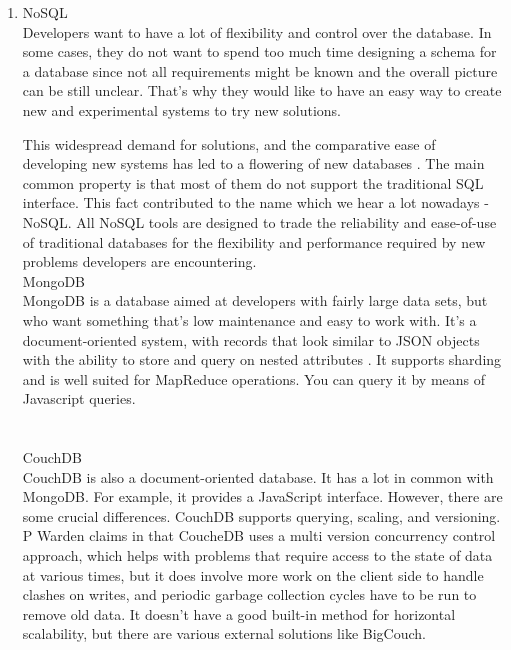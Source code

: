 \documentclass[runningheads]{llncs}
\begin{document}
\begin{enumerate}
\item NoSQL\\

Developers want to have a lot of flexibility and control over the database. In some cases, they do not want to spend too much time designing a schema for a database since not all requirements might be known and the overall picture can be still unclear. That's why they would like to have an easy way to create new and experimental systems to try new solutions.

This widespread demand for solutions, and the comparative ease of developing new systems has led to a flowering of new databases \cite{GLOSSARY}. The main common property is that most of them do not support the traditional SQL interface. This fact contributed to the name which we hear a lot nowadays - NoSQL. All NoSQL tools are designed to trade the reliability and ease-of-use of traditional databases for the flexibility and performance required by new problems developers are encountering.\\

MongoDB\\

MongoDB is a database aimed at developers with fairly large data sets, but who want something that's low maintenance and easy to work with. It's a document-oriented system, with records that look similar to JSON objects with the ability to store and query on nested attributes \cite{GLOSSARY}. It supports sharding and is well suited for MapReduce operations. You can query it by means of Javascript queries.\\
\\
\\
CouchDB\\

CouchDB is also a document-oriented database. It has a lot in common with MongoDB. For example, it provides
a JavaScript interface. However, there are some crucial differences. CouchDB supports querying, scaling, and versioning. P Warden claims in \cite{GLOSSARY} that CoucheDB uses a multi version concurrency control approach, which helps with problems that require access to the state of data at various times, but it does involve more work on the client side to handle clashes on writes, and periodic garbage collection cycles have to be run to remove old data. It doesn't have a good built-in method for horizontal scalability, but there are various external solutions like BigCouch.\\


\end{enumerate}
\end{document}
